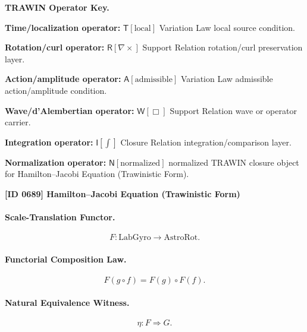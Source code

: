 \par\vspace{0.45\baselineskip}
\noindent\begin{minipage}[t]{\linewidth}
\begingroup
\small
\raggedright
\textbf{TRAWIN Operator Key.}\par
\noindent\textbf{Time/localization operator:} $\mathsf{T}\!\left[\mathrm{local}\right]$ Variation Law local source condition.\par
\noindent\textbf{Rotation/curl operator:} $\mathsf{R}\!\left[\nabla\times\right]$ Support Relation rotation/curl preservation layer.\par
\noindent\textbf{Action/amplitude operator:} $\mathsf{A}\!\left[\mathrm{admissible}\right]$ Variation Law admissible action/amplitude condition.\par
\noindent\textbf{Wave/d'Alembertian operator:} $\mathsf{W}\!\left[\Box\right]$ Support Relation wave or operator carrier.\par
\noindent\textbf{Integration operator:} $\mathsf{I}\!\left[\int\right]$ Closure Relation integration/comparison layer.\par
\noindent\textbf{Normalization operator:} $\mathsf{N}\!\left[\mathrm{normalized}\right]$ normalized TRAWIN closure object for Hamilton--Jacobi Equation (Trawinistic Form).\par
\endgroup
\end{minipage}

\clearpage
\noindent\textbf{[ID 0689] Hamilton--Jacobi Equation (Trawinistic Form)}\par
\vspace{0.35em}
\paragraph{Scale-Translation Functor.}
\begin{equation}
F:\mathrm{LabGyro}\longrightarrow\mathrm{AstroRot}.
\end{equation}

\paragraph{Functorial Composition Law.}
\begin{equation}
F(g\circ f)
=
F(g)\circ F(f).
\end{equation}

\paragraph{Natural Equivalence Witness.}
\begin{equation}
\eta:F\Rightarrow G .
\end{equation}

